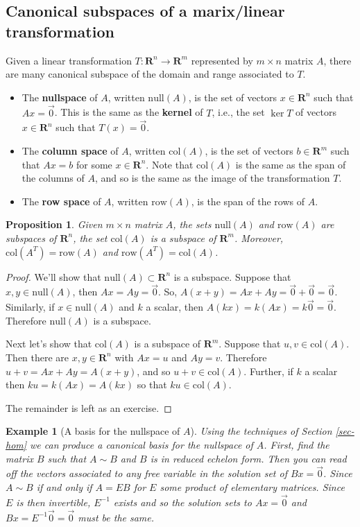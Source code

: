 \documentclass[12pt]{article}
\numberwithin{equation}{subsection}
\numberwithin{figure}{subsection}
\newtheorem{prop}[subsection]{Proposition}
\theoremstyle{note}
\newtheorem{example}[subsection]{Example}
\newcommand\nul[1]{\mathrm{null}(#1)}
\newcommand\col[1]{\mathrm{col}(#1)}
\newcommand\row[1]{\mathrm{row}(#1)}
\begin{document}
\subsection{Canonical subspaces of a marix/linear transformation}

Given a linear transformation $T\colon \mathbf{R}^n\to\mathbf{R}^m$ represented by $m\times n$ matrix $A$, there are many canonical subspace of the domain and range associated to $T$. 

\begin{itemize}
	\item The \textbf{nullspace} of $A$, written $\nul{A}$, is the set of vectors $x\in\mathbf{R}^n$ such that $Ax=\vec{0}$. This is the same as the \textbf{kernel} of $T$, i.e., the set $\ker T$ of vectors $x\in\mathbf{R}^n$ such that $T(x)=\vec{0}$.
	\item The \textbf{column space} of $A$, written $\col{A}$, is the set of vectors $b\in\mathbf{R}^m$ such that $Ax=b$ for some $x \in \mathbf{R}^n$. Note that $\col{A}$ is the same as the span of the columns of $A$, and so is the same as the image of the transformation $T$.
	\item The \textbf{row space} of $A$, written $\row{A}$, is the span of the rows of $A$. 
\end{itemize}

\begin{prop}
	Given $m\times n$ matrix $A$, the sets $\nul{A}$ and $\row{A}$ are subspaces of $\mathbf{R}^n$, the set $\col{A}$ is a subspace of $\mathbf{R}^m$. Moreover, $\col{A^T}=\row{A}$ and $\row{A^T}=\col{A}$.
\end{prop}

\begin{proof}
	We'll show that $\nul{A}\subset \mathbf{R}^n$ is a subspace. Suppose that $x,y\in \nul{A}$, then $Ax=Ay=\vec{0}$. So, $A(x+y)=Ax+Ay=\vec{0}+\vec{0}=\vec{0}$. Similarly, if $x\in \nul{A}$ and $k$ a scalar, then $A(kx)=k(Ax)=k\vec{0}=\vec{0}$. Therefore $\nul{A}$ is a subspace.
	
	Next let's show that $\col{A}$ is a subspace of $\mathbf{R}^m$. Suppose that $u,v\in \col{A}$. Then there are $x,y\in\mathbf{R}^n$ with $Ax=u$ and $Ay=v$. Therefore $u+v=Ax+Ay=A(x+y)$, and so $u+v\in \col{A}$. Further, if $k$ a scalar then $ku=k(Ax)=A(kx)$ so that $ku\in \col{A}$. 
	
	The remainder is left as an exercise. 
\end{proof}

\begin{example}[A basis for the nullspace of $A$]
	Using the techniques of Section \ref{sec-hom} we can produce a canonical basis for the nullspace of $A$. First, find the matrix $B$ such that $A\sim B$ and $B$ is in reduced echelon form. Then you can read off the vectors associated to any free variable in the solution set of $Bx=\vec{0}$. Since $A\sim B$ if and only if $A=EB$ for $E$ some product of elementary matrices. Since $E$ is then invertible, $E^{-1}$ exists and so the solution sets to $Ax=\vec{0}$ and $Bx=E^{-1}\vec{0}=\vec{0}$ must be the same.

\end{example}
\end{document}
